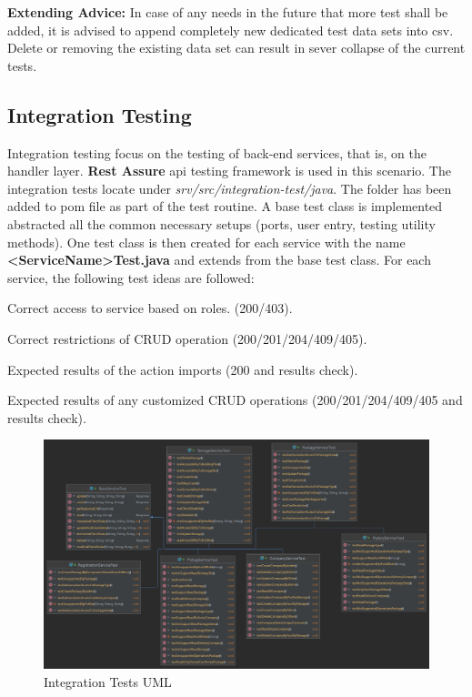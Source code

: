 \bigskip
\textbf{Extending Advice:} In case of any needs in the future that more test shall be added, it is advised to append completely new dedicated test data sets into csv. Delete or removing the existing data set can result in sever collapse of the current tests.

\subsection{Integration Testing}
Integration testing focus on the testing of back-end services, that is, on the handler layer. \textbf{Rest Assure} api testing framework is used in this scenario.
The integration tests locate under \textit{srv/src/integration-test/java}. The folder has been added to pom file as part of the test routine. A base test class is implemented abstracted all the common necessary setups (ports, user entry, testing utility methods). One test class is then created for each service with the name \textbf{<ServiceName>Test.java} and extends from the base test class. For each service, the following test ideas are followed:
\begin{compactenum}
	\item Correct access to service based on roles. (200/403).
    \item Correct restrictions of CRUD operation (200/201/204/409/405).
    \item Expected results of the action imports (200 and results check).
    \item Expected results of any customized CRUD operations (200/201/204/409/405 and results check).
\end{compactenum}

\begin{figure}[H]
    \centering
    \includegraphics[width=1\linewidth]{images/test/api.png}
    \caption{Integration Tests UML}
    \label{fig:it_uml}
\end{figure}

